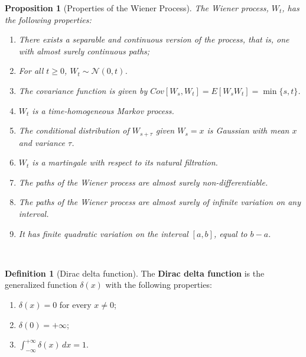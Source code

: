\documentclass[
  11pt,
  a4paper,
]{book}
\newtheorem{proposition}{Proposition}[chapter]
\theoremstyle{definition}
\newtheorem{definition}{Definition}[chapter]
\theoremstyle{definition}
\theoremstyle{definition}
\theoremstyle{definition}
\theoremstyle{remark}
\begin{document}
\begin{proposition}[Properties of the Wiener Process]

The Wiener process, \(W_t\), has the following properties:

\begin{enumerate}
\def\labelenumi{\arabic{enumi}.}
\item
  There exists a separable and continuous version of the process, that is, one with almost surely continuous paths;
\item
  For all \(t \geq 0\), \(W_t \sim \mathcal{N}(0,t)\).
\item
  The covariance function is given by \(Cov[W_s, W_t] = E[W_s W_t] = \min\{s, t\}\).
\item
  \(W_t\) is a time-homogeneous Markov process.
\item
  The conditional distribution of \(W_{s+\tau}\) given \(W_s = x\) is Gaussian with mean \(x\) and variance \(\tau\).
\item
  \(W_t\) is a martingale with respect to its natural filtration.
\item
  The paths of the Wiener process are almost surely non-differentiable.
\item
  The paths of the Wiener process are almost surely of infinite variation on any interval.
\item
  It has finite quadratic variation on the interval \([a,b]\), equal to \(b-a\).
\end{enumerate}

\end{proposition}

\(\,\)

\begin{definition}[Dirac delta function]

The \textbf{Dirac delta function} is the generalized function \(\delta(x)\) with the following properties:

\begin{enumerate}
\def\labelenumi{\arabic{enumi}.}
\item
  \(\delta(x) = 0\) for every \(x \neq 0\);
\item
  \(\delta(0) = +\infty\);
\item
  \(\displaystyle \int_{-\infty}^{+\infty} \delta(x)\,dx = 1\).
\end{enumerate}

\end{definition}

\(\,\)
\end{document}
